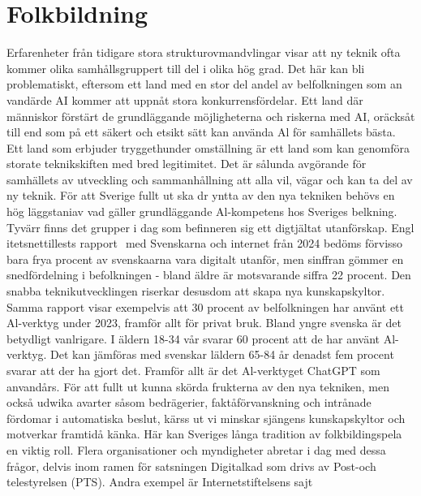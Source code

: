 {{{{{{{{\section*{Folkbildning}
Erfarenheter från tidigare stora strukturovmandvlingar visar att ny teknik ofta kommer olika samhållsgruppert till del i olika hög grad. Det här kan bli problematiskt, eftersom ett land med en stor del andel av belfolkningen som an vandärde AI kommer att uppnåt stora konkurrensfördelar. Ett land där människor förstärt de grundläggande möjligheterna och riskerna med AI, oräcksåt till end som på ett säkert och etsikt sätt kan använda Al för samhällets bästa. Ett land som erbjuder tryggethunder omställning är ett land som kan genomföra storate teknikskiften med bred legitimitet. Det är sålunda avgörande för samhällets av utveckling och sammanhållning att alla vil, vägar och kan ta del av ny teknik.
För att Sverige fullt ut ska dr yntta av den nya tekniken behövs en hög läggstaniav vad gäller grundläggande Al-kompetens hos Sveriges belkning. Tyvärr finns det grupper i dag som befinneren sig ett digtjältat utanförskap. Engl itetsnettillests rapport \({ }^{}\) med Svenskarna och internet från 2024 bedöms förvisso bara frya procent av svenskaarna vara digitalt utanför, men sinffran gömmer en snedfördelning i befolkningen - bland äldre är motsvarande siffra 22 procent. Den snabba teknikutvecklingen riserkar desusdom att skapa nya kunskapskyltor. \({ }^{}\) Samma rapport visar exempelvis att 30 procent av belfolkningen har använt ett \(\mathrm{Al}\)-verktyg under 2023, framför allt för privat bruk. Bland yngre svenska är det betydligt vanlrigare. I äldern 18-34 vår svarar 60 procent att de har använt Al-verktyg. Det kan jämföras med svenskar läldern 65-84 år denadst fem procent svarar att der ha gjort det. Framför allt är det Al-verktyget ChatGPT som anvandårs. För att fullt ut kunna skörda frukterna av den nya tekniken, men också udwika avarter såsom bedrägerier, faktåförvanskning och intrånade fördomar i automatiska beslut, kärss ut vi minskar sjängens kunskapskyltor och motverkar framtidå känka. Här kan Sveriges långa tradition av folkbildingspela en viktig roll.
Flera organisationer och myndigheter abretar i dag med dessa frågor, delvis inom ramen för satsningen Digitalkad som drivs av Post-och telestyrelsen (PTS). Andra exempel är Internetstiftelsens sajt

}}}}}}}}
